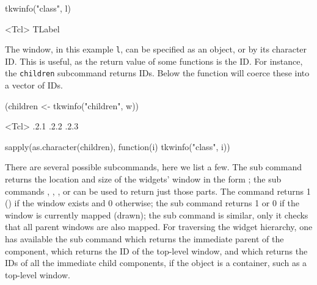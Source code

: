 \begin{Schunk}
\begin{Sinput}
 tkwinfo("class", l)
\end{Sinput}
\begin{Soutput}
<Tcl> TLabel 
\end{Soutput}
\end{Schunk}
%

The window, in this example \texttt{l}, can be specified as an \R\/
object, or by its character ID. This is useful, as the return value of
some functions is the ID. For instance, the \texttt{children}
subcommand returns IDs. Below the  function will
coerce these into a vector of IDs.

\begin{Schunk}
\begin{Sinput}
 (children <- tkwinfo("children", w))
\end{Sinput}
\begin{Soutput}
<Tcl> .2.1 .2.2 .2.3 
\end{Soutput}
\begin{Sinput}
 sapply(as.character(children), function(i) tkwinfo("class", i))
\end{Sinput}
\end{Schunk}

There are several possible subcommands, here we list a few. The
 sub command returns the location and
size of the widgets' window in the form ;
the sub commands ,
, , or
 can be used to return just those parts. The
 command returns 1 () if the
window exists and 0 otherwise; the  sub
command returns 1 or 0 if the window is currently mapped (drawn); the
 sub command is similar, only it checks
that all parent windows are also mapped.  For traversing the widget
hierarchy, one has available the  sub
command which returns the immediate parent of the component,
 which returns the ID of the top-level
window, and  which returns the IDs of
all the immediate child components, if the object is a container, such
as a top-level window.


